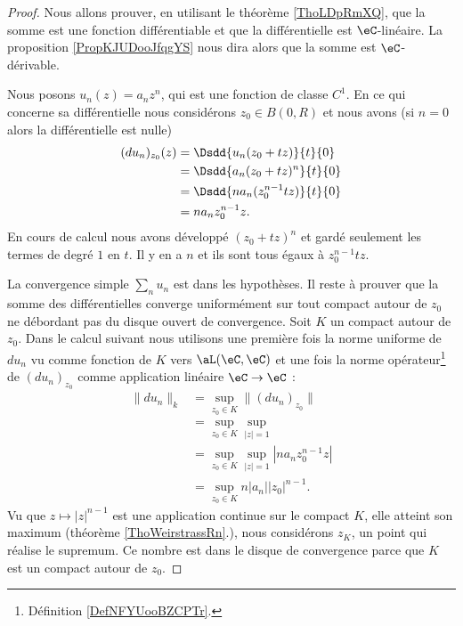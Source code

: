\begin{proof}
    Nous allons prouver, en utilisant le théorème \ref{ThoLDpRmXQ}, que la somme est une fonction différentiable et que la différentielle est \( \eC\)-linéaire. La proposition \ref{PropKJUDooJfqgYS} nous dira alors que la somme est \( \eC\)-dérivable.

    Nous posons \( u_n(z)=a_nz^n\), qui est une fonction de classe \( C^1\). En ce qui concerne sa différentielle nous considérons \( z_0\in B(0,R)\)  et nous avons    (si \( n=0\) alors la différentielle est nulle)
    \begin{subequations}
        \begin{align}
            (du_n)_{z_0}(z)&=\Dsdd{ u_n(z_0+tz) }{t}{0}\\
            &=\Dsdd{ a_n(z_0+tz)^n }{t}{0}\\
            &=\Dsdd{ na_n(z_0^{n-1}tz) }{t}{0}\\
            &=na_nz_0^{n-1}z.
        \end{align}
    \end{subequations}
    En cours de calcul nous avons développé \( (z_0+tz)^n\) et gardé seulement les termes de degré \( 1\) en \( t\). Il y en a \( n\) et ils sont tous égaux à \( z_0^{n-1}tz\).

    La convergence simple \( \sum_nu_n\) est dans les hypothèses. Il reste à prouver que la somme des différentielles converge uniformément sur tout compact autour de \( z_0\) ne débordant pas du disque ouvert de convergence. Soit \( K\) un compact autour de \( z_0\). Dans le calcul suivant nous utilisons une première fois la norme uniforme de \( du_n\) vu comme fonction de \( K\) vers \( \aL(\eC,\eC)\) et une fois la norme opérateur\footnote{Définition \ref{DefNFYUooBZCPTr}.} de \( (du_n)_{z_0}\) comme application linéaire \( \eC\to \eC\) :
    \begin{subequations}
        \begin{align}
            \| du_n \|_k&=\sup_{z_0\in K}\| (du_n)_{z_0} \|\\
            &=\sup_{z_0\in K}\sup_{| z |=1}\\
            &=\sup_{z_0\in K}\sup_{| z |=1}| na_nz_0^{n-1}z |\\
            &=\sup_{z_0\in K}n| a_n | |z_0 |^{n-1}.
        \end{align}
    \end{subequations}
    Vu que \( z\mapsto| z |^{n-1}\) est une application continue sur le compact \( K\), elle atteint son maximum (théorème \ref{ThoWeirstrassRn}.), nous considérons \( z_K\), un point qui réalise le supremum. Ce nombre est dans le disque de convergence parce que \( K\) est un compact autour de \( z_0\). 
    

\end{proof}
